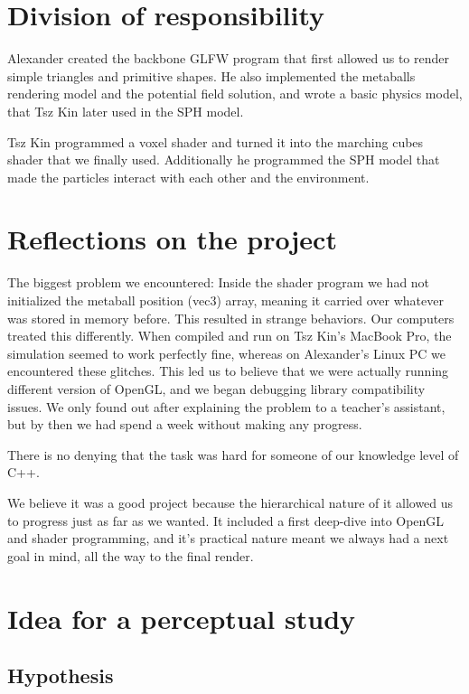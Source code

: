 \documentclass{article}
\begin{document}
\begin{multicols}{2}
    \section{Division of responsibility}

    Alexander created the backbone GLFW program that first allowed us to render simple triangles and primitive shapes. He also implemented the metaballs rendering model and the potential field solution, and wrote a basic physics model, that Tsz Kin later used in the SPH model.

    Tsz Kin programmed a voxel shader and turned it into the marching cubes shader that we finally used. Additionally he programmed the SPH model that made the particles interact with each other and the environment.

    \section{Reflections on the project}

    The biggest problem we encountered:
    Inside the shader program we had not initialized the metaball position (vec3) array, meaning it carried over whatever was stored in memory before.
    This resulted in strange behaviors.
    Our computers treated this differently. When compiled and run on Tsz Kin's MacBook Pro, the simulation seemed to work perfectly fine, whereas on Alexander's Linux PC we encountered these glitches. This led us to believe that we were actually running different version of OpenGL, and we began debugging library compatibility issues. We only found out after explaining the problem to a teacher's assistant, but by then we had spend a week without making any progress.

    There is no denying that the task was hard for someone of our knowledge level of C++. 


    We believe it was a good project because the hierarchical nature of it allowed us to progress just as far as we wanted.
    It included a first deep-dive into OpenGL and shader programming, and it's practical nature meant we always had a next goal in mind, all the way to the final render.

    \section{Idea for a perceptual study}

        \subsection{Hypothesis}


\end{multicols}
\end{document}
